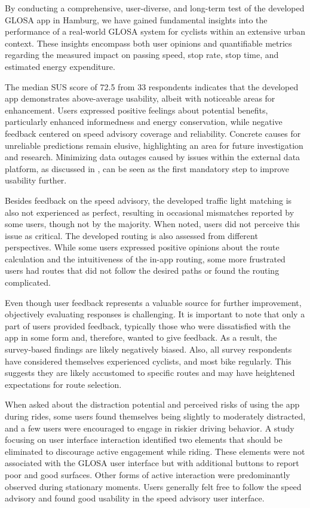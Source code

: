 \begin{Summary}
By conducting a comprehensive, user-diverse, and long-term test of the developed GLOSA app in Hamburg, we have gained fundamental insights into the performance of a real-world GLOSA system for cyclists within an extensive urban context. These insights encompass both user opinions and quantifiable metrics regarding the measured impact on passing speed, stop rate, stop time, and estimated energy expenditure.

The median SUS score of 72.5 from 33 respondents indicates that the developed app demonstrates above-average usability, albeit with noticeable areas for enhancement. Users expressed positive feelings about potential benefits, particularly enhanced informedness and energy conservation, while negative feedback centered on speed advisory coverage and reliability. Concrete causes for unreliable predictions remain elusive, highlighting an area for future investigation and research. Minimizing data outages caused by issues within the external data platform, as discussed in , can be seen as the first mandatory step to improve usability further. 

Besides feedback on the speed advisory, the developed traffic light matching is also not experienced as perfect, resulting in occasional mismatches reported by some users, though not by the majority. When noted, users did not perceive this issue as critical. The developed routing is also assessed from different perspectives. While some users expressed positive opinions about the route calculation and the intuitiveness of the in-app routing, some more frustrated users had routes that did not follow the desired paths or found the routing complicated. 

Even though user feedback represents a valuable source for further improvement, objectively evaluating responses is challenging. It is important to note that only a part of users provided feedback, typically those who were dissatisfied with the app in some form and, therefore, wanted to give feedback. As a result, the survey-based findings are likely negatively biased. Also, all survey respondents have considered themselves experienced cyclists, and most bike regularly. This suggests they are likely accustomed to specific routes and may have heightened expectations for route selection.

When asked about the distraction potential and perceived risks of using the app during rides, some users found themselves being slightly to moderately distracted, and a few users were encouraged to engage in riskier driving behavior. A study focusing on user interface interaction identified two elements that should be eliminated to discourage active engagement while riding. These elements were not associated with the GLOSA user interface but with additional buttons to report poor and good surfaces. Other forms of active interaction were predominantly observed during stationary moments. Users generally felt free to follow the speed advisory and found good usability in the speed advisory user interface. 


\end{Summary}
